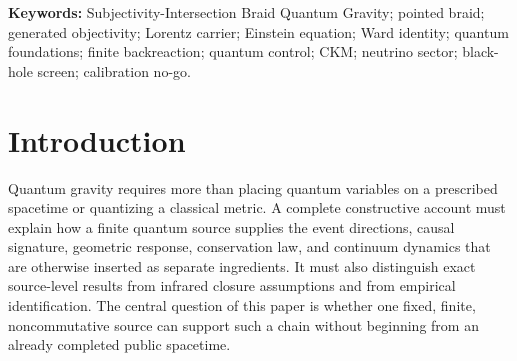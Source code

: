 \documentclass[11pt]{article}
\theoremstyle{definition}
\theoremstyle{remark}
\begin{document}
\begin{abstract}
The neutral operational sector closes a further formal chain. Source conjugation induces a noncommuting $C_3$ history transport; the generated $*$-algebra is $M_3(\mathbb C)$ with scalar commutant, and a unique pointed oriented weak-current intertwiner types this internal qutrit as the physical three-generation neutrino factor inside the derived matter class. A source-ordered weighted Floquet operator is exactly unitary and carries unequal eigenphase gaps and a nonzero CP-odd invariant. These are source-derived formal results, not an empirical PMNS or neutrino-mass match. In the compact-object sector, a positive event number, quadratic excitation Casimir, primitive boundary index, refinement-invariant screen area, and source-normalized fixed-boundary Misner--Sharp spectrum are derived. Absolute SI calibration remains open. The typed clock--screen modular generator has rank-four response, but its scalar misses the required transfer; the minimal discrete parity/reflection plaquette is exactly the identity in all eight sectors. The construction therefore connects quantum structure, geometry, conservation, gravity, matter and finite screens while retaining an explicit no-go boundary on absolute scale. It refutes objectivist primacy as a universal necessity thesis without denying mind-independent reality.
\end{abstract}

\noindent\textbf{Keywords:} Subjectivity-Intersection Braid Quantum Gravity; pointed braid; generated objectivity; Lorentz carrier; Einstein equation; Ward identity; quantum foundations; finite backreaction; quantum control; CKM; neutrino sector; black-hole screen; calibration no-go.

\section{Introduction}

Quantum gravity requires more than placing quantum variables on a prescribed
spacetime or quantizing a classical metric. A complete constructive account
must explain how a finite quantum source supplies the event directions,
causal signature, geometric response, conservation law, and continuum
dynamics that are otherwise inserted as separate ingredients. It must also
distinguish exact source-level results from infrared closure assumptions and
from empirical identification. The central question of this paper is whether
one fixed, finite, noncommutative source can support such a chain without
beginning from an already completed public spacetime.
\end{document}
